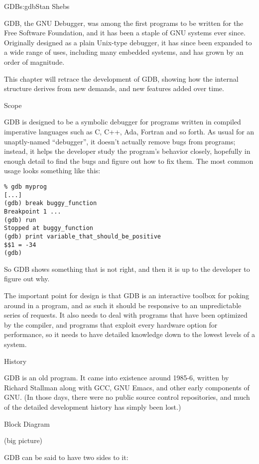 \begin{aosachapter}{GDB}{s:gdb}{Stan Shebs}

GDB, the GNU Debugger, was among the first programs to be written for
the Free Software Foundation, and it has been a staple of GNU systems
ever since.  Originally designed as a plain Unix-type debugger, it has
since been expanded to a wide range of uses, including many embedded
systems, and has grown by an order of magnitude.

This chapter will retrace the development of GDB, showing how the
internal structure derives from new demands, and new features added
over time.

Scope

GDB is designed to be a symbolic debugger for programs written in
compiled imperative languages such as C, C++, Ada, Fortran and so
forth.  As usual for an unaptly-named ``debugger'', it doesn't
actually remove bugs from programs; instead, it helps the developer
study the program's behavior closely, hopefully in enough detail to
find the bugs and figure out how to fix them.  The most common usage
looks something like this:

\begin{verbatim}
% gdb myprog
[...]
(gdb) break buggy_function
Breakpoint 1 ...
(gdb) run
Stopped at buggy_function
(gdb) print variable_that_should_be_positive
$$1 = -34
(gdb)
\end{verbatim}

So GDB shows something that is not right, and then it is up to the developer
to figure out why.

The important point for design is that GDB is an interactive toolbox
for poking around in a program, and as such it should be responsive
to an unpredictable series of requests.  It also needs to deal with
programs that have been optimized by the compiler, and programs that
exploit every hardware option for performance, so it needs to have
detailed knowledge down to the lowest levels of a system.

History

GDB is an old program.  It came into existence around 1985-6, written
by Richard Stallman along with GCC, GNU Emacs, and other early
components of GNU.  (In those days, there were no public source
control repositories, and much of the detailed development history
has simply been lost.)

Block Diagram

(big picture)

GDB can be said to have two sides to it:


\end{aosachapter}
